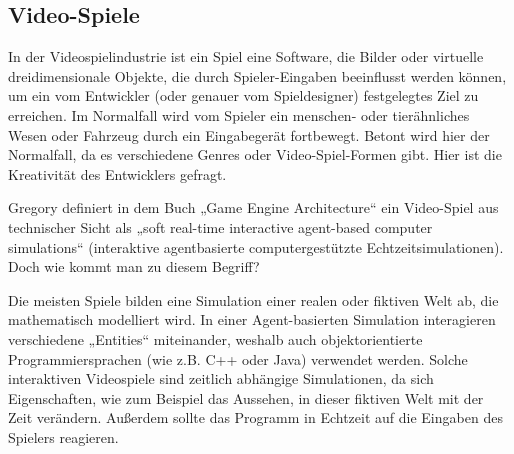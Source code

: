 \subsection{Video-Spiele}

In der Videospielindustrie ist ein Spiel eine Software, die Bilder oder virtuelle dreidimensionale Objekte, die durch Spieler-Eingaben beeinflusst werden können, um ein vom Entwickler (oder genauer vom Spieldesigner) festgelegtes Ziel zu erreichen. 
Im Normalfall wird vom Spieler ein menschen- oder tierähnliches Wesen oder Fahrzeug durch ein Eingabegerät fortbewegt. Betont wird hier der Normalfall, da es verschiedene Genres oder Video-Spiel-Formen gibt. Hier ist die Kreativität des Entwicklers gefragt.

Gregory definiert in dem Buch „Game Engine Architecture“ ein Video-Spiel aus technischer Sicht als „soft real-time interactive agent-based computer simulations“ \cite{gea} (interaktive agentbasierte computergestützte Echtzeitsimulationen).
Doch wie kommt man zu diesem Begriff?

Die meisten Spiele bilden eine Simulation einer realen oder fiktiven Welt ab, die mathematisch modelliert wird. In einer Agent-basierten Simulation interagieren verschiedene „Entities“ miteinander, weshalb auch objektorientierte Programmiersprachen (wie z.B. C++ oder Java) verwendet werden.
Solche interaktiven Videospiele sind zeitlich abhängige Simulationen, da sich Eigenschaften, wie zum Beispiel das Aussehen, in dieser fiktiven Welt mit der Zeit verändern. Außerdem sollte das Programm in Echtzeit auf die Eingaben des Spielers reagieren.
